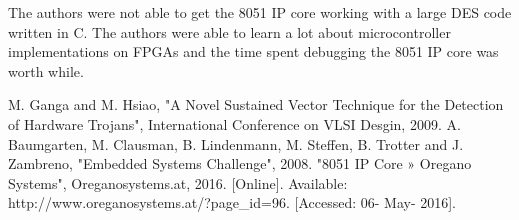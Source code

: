 \documentclass[letterpaper, 10 pt, conference]{ieeeconf}  %
\begin{document}
The authors were not able to get the 8051 IP core working with a large DES code written in C.  The authors were able to learn a lot about microcontroller implementations on FPGAs and the time spent debugging the 8051 IP core was worth while. 

\addtolength{\textheight}{-12cm}   %















\begin{thebibliography}{99}

 M. Ganga and M. Hsiao, "A Novel Sustained Vector Technique for the Detection of Hardware Trojans", International Conference on VLSI Desgin, 2009.
 A. Baumgarten, M. Clausman, B. Lindenmann, M. Steffen, B. Trotter and J. Zambreno, "Embedded Systems Challenge", 2008.
 "8051 IP Core » Oregano Systems", Oreganosystems.at, 2016. [Online]. Available: http://www.oreganosystems.at/?page\_id=96. [Accessed: 06- May- 2016].

\end{thebibliography}
\end{document}

